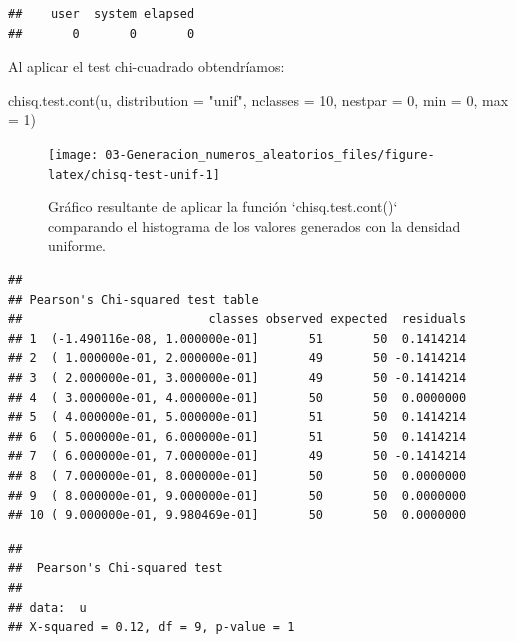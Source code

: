 \documentclass[
]{book}
\newenvironment{Shaded}{\begin{snugshade}}{\end{snugshade}}
\newcommand{\AttributeTok}[1]{\textcolor[rgb]{0.77,0.63,0.00}{#1}}
\newcommand{\DecValTok}[1]{\textcolor[rgb]{0.00,0.00,0.81}{#1}}
\newcommand{\FunctionTok}[1]{\textcolor[rgb]{0.00,0.00,0.00}{#1}}
\newcommand{\NormalTok}[1]{#1}
\newcommand{\StringTok}[1]{\textcolor[rgb]{0.31,0.60,0.02}{#1}}
\theoremstyle{break}
\theoremstyle{definition}
\theoremstyle{definition}
\theoremstyle{definition}
\theoremstyle{definition}
\theoremstyle{remark}
\begin{document}
\begin{verbatim}
##    user  system elapsed 
##       0       0       0
\end{verbatim}

Al aplicar el test chi-cuadrado obtendríamos:

\begin{Shaded}
\begin{Highlighting}[]
\FunctionTok{chisq.test.cont}\NormalTok{(u, }\AttributeTok{distribution =} \StringTok{"unif"}\NormalTok{, }
                \AttributeTok{nclasses =} \DecValTok{10}\NormalTok{, }\AttributeTok{nestpar =} \DecValTok{0}\NormalTok{, }\AttributeTok{min =} \DecValTok{0}\NormalTok{, }\AttributeTok{max =} \DecValTok{1}\NormalTok{)}
\end{Highlighting}
\end{Shaded}

\begin{figure}[!htb]

{\centering \texttt{[image: 03-Generacion\_numeros\_aleatorios\_files/figure-latex/chisq-test-unif-1]} 

}

\caption{Gráfico resultante de aplicar la función `chisq.test.cont()` comparando el histograma de los valores generados con la densidad uniforme.}\label{fig:chisq-test-unif}
\end{figure}

\begin{verbatim}
## 
## Pearson's Chi-squared test table
##                          classes observed expected  residuals
## 1  (-1.490116e-08, 1.000000e-01]       51       50  0.1414214
## 2  ( 1.000000e-01, 2.000000e-01]       49       50 -0.1414214
## 3  ( 2.000000e-01, 3.000000e-01]       49       50 -0.1414214
## 4  ( 3.000000e-01, 4.000000e-01]       50       50  0.0000000
## 5  ( 4.000000e-01, 5.000000e-01]       51       50  0.1414214
## 6  ( 5.000000e-01, 6.000000e-01]       51       50  0.1414214
## 7  ( 6.000000e-01, 7.000000e-01]       49       50 -0.1414214
## 8  ( 7.000000e-01, 8.000000e-01]       50       50  0.0000000
## 9  ( 8.000000e-01, 9.000000e-01]       50       50  0.0000000
## 10 ( 9.000000e-01, 9.980469e-01]       50       50  0.0000000
\end{verbatim}

\begin{verbatim}
## 
##  Pearson's Chi-squared test
## 
## data:  u
## X-squared = 0.12, df = 9, p-value = 1
\end{verbatim}
\end{document}
